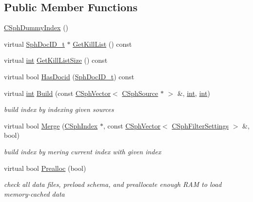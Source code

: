 \subsection*{Public Member Functions}
\begin{DoxyCompactItemize}
\item 
\hyperlink{classCSphDummyIndex_a949fc311a9743ecb38a9f8eae283cc8b}{C\-Sph\-Dummy\-Index} ()
\item 
virtual \hyperlink{sphinx_8h_a3176771631c12a9e4897272003e6b447}{Sph\-Doc\-I\-D\-\_\-t} $\ast$ \hyperlink{classCSphDummyIndex_a6e1b5e0ea053f6fce94c4a540eb2909a}{Get\-Kill\-List} () const 
\item 
virtual \hyperlink{sphinxexpr_8cpp_a4a26e8f9cb8b736e0c4cbf4d16de985e}{int} \hyperlink{classCSphDummyIndex_acc3dd24e36c2af9f6f31694e84509d76}{Get\-Kill\-List\-Size} () const 
\item 
virtual bool \hyperlink{classCSphDummyIndex_ad9574d57481f70067f81a4c6a21161a7}{Has\-Docid} (\hyperlink{sphinx_8h_a3176771631c12a9e4897272003e6b447}{Sph\-Doc\-I\-D\-\_\-t}) const 
\item 
virtual \hyperlink{sphinxexpr_8cpp_a4a26e8f9cb8b736e0c4cbf4d16de985e}{int} \hyperlink{classCSphDummyIndex_a02cb57467541a3c7fbba17e5e9b4bf21}{Build} (const \hyperlink{classCSphVector}{C\-Sph\-Vector}$<$ \hyperlink{classCSphSource}{C\-Sph\-Source} $\ast$ $>$ \&, \hyperlink{sphinxexpr_8cpp_a4a26e8f9cb8b736e0c4cbf4d16de985e}{int}, \hyperlink{sphinxexpr_8cpp_a4a26e8f9cb8b736e0c4cbf4d16de985e}{int})
\begin{DoxyCompactList}\small\item\em build index by indexing given sources \end{DoxyCompactList}\item 
virtual bool \hyperlink{classCSphDummyIndex_a8640203372170a92541be30ffd95c261}{Merge} (\hyperlink{classCSphIndex}{C\-Sph\-Index} $\ast$, const \hyperlink{classCSphVector}{C\-Sph\-Vector}$<$ \hyperlink{classCSphFilterSettings}{C\-Sph\-Filter\-Settings} $>$ \&, bool)
\begin{DoxyCompactList}\small\item\em build index by mering current index with given index \end{DoxyCompactList}\item 
virtual bool \hyperlink{classCSphDummyIndex_a9ca432e4e70fd44987f0139f41de66e8}{Prealloc} (bool)
\begin{DoxyCompactList}\small\item\em check all data files, preload schema, and preallocate enough R\-A\-M to load memory-\/cached data \end{DoxyCompactList}\item 

\end{DoxyCompactItemize}
